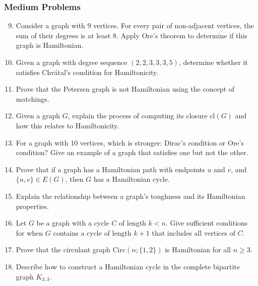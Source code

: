 \documentclass{article}
\theoremstyle{definition}
\begin{document}
\subsubsection{Medium Problems}
\begin{enumerate}\setcounter{enumi}{8}
\item Consider a graph with 9 vertices. For every pair of non-adjacent vertices, the sum of their degrees is at least 8. Apply Ore's theorem to determine if this graph is Hamiltonian.

\item Given a graph with degree sequence $(2, 2, 3, 3, 3, 5)$, determine whether it satisfies Chvátal's condition for Hamiltonicity.

\item Prove that the Petersen graph is not Hamiltonian using the concept of matchings.

\item Given a graph $G$, explain the process of computing its closure $\text{cl}(G)$ and how this relates to Hamiltonicity.

\item For a graph with 10 vertices, which is stronger: Dirac's condition or Ore's condition? Give an example of a graph that satisfies one but not the other.

\item Prove that if a graph has a Hamiltonian path with endpoints $u$ and $v$, and $\{u,v\} \in E(G)$, then $G$ has a Hamiltonian cycle.

\item Explain the relationship between a graph's toughness and its Hamiltonian properties.

\item Let $G$ be a graph with a cycle $C$ of length $k < n$. Give sufficient conditions for when $G$ contains a cycle of length $k+1$ that includes all vertices of $C$.

\item Prove that the circulant graph $\text{Circ}(n;\{1,2\})$ is Hamiltonian for all $n \geq 3$.

\item Describe how to construct a Hamiltonian cycle in the complete bipartite graph $K_{3,3}$.
\end{enumerate}
\end{document}
